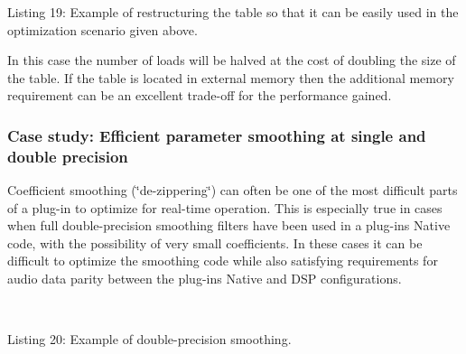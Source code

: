 \begin{DoxyCode}{0}
\DoxyCodeLine{\textcolor{comment}{// instead of this classic variant...}}
\DoxyCodeLine{\}}
\DoxyCodeLine{}
\DoxyCodeLine{\textcolor{comment}{// ...table can be organized this way}}
\DoxyCodeLine{\}}
\end{DoxyCode}
  Listing 19\+: Example of restructuring the table so that it can be easily used in the optimization scenario given above.

In this case the number of loads will be halved at the cost of doubling the size of the table. If the table is located in external memory then the additional memory requirement can be an excellent trade-\/off for the performance gained.

\hypertarget{a00832_subsection__case_study_efficient_parameter_smoothing_at_single_and_double_precision}{}\subsubsection{Case study\+: Efficient parameter smoothing at single and double precision}\label{a00832_subsection__case_study_efficient_parameter_smoothing_at_single_and_double_precision}
 Coefficient smoothing (\char`\"{}de-\/zippering\char`\"{}) can often be one of the most difficult parts of a plug-\/in to optimize for real-\/time operation. This is especially true in cases when full double-\/precision smoothing filters have been used in a plug-\/in\textquotesingle{}s Native code, with the possibility of very small coefficients. In these cases it can be difficult to optimize the smoothing code while also satisfying requirements for audio data parity between the plug-\/in\textquotesingle{}s Native and D\+SP configurations.

~


\begin{DoxyCode}{0}
\DoxyCodeLine{}
\DoxyCodeLine{\textcolor{comment}{// Double - precision}}
\DoxyCodeLine{\{}
\DoxyCodeLine{\} }
\end{DoxyCode}
  Listing 20\+: Example of double-\/precision smoothing.

